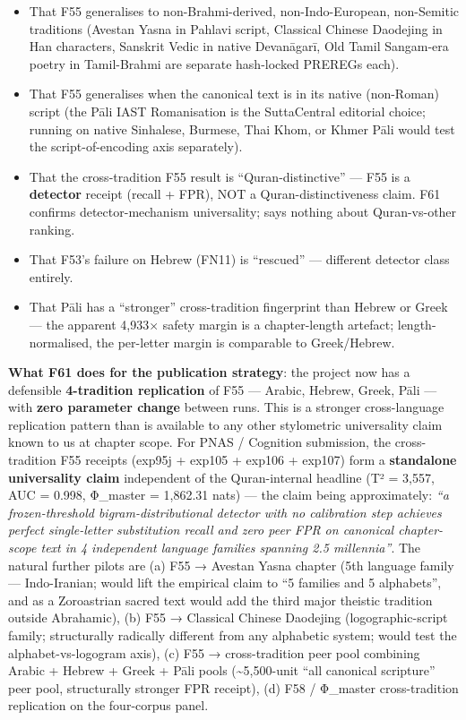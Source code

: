 \documentclass[
]{article}
\providecommand{\tightlist}{%
  \setlength{\itemsep}{0pt}\setlength{\parskip}{0pt}}
\begin{document}
\begin{itemize}
\tightlist
\item
  That F55 generalises to non-Brahmi-derived, non-Indo-European,
  non-Semitic traditions (Avestan Yasna in Pahlavi script, Classical
  Chinese Daodejing in Han characters, Sanskrit Vedic in native
  Devanāgarī, Old Tamil Sangam-era poetry in Tamil-Brahmi are separate
  hash-locked PREREGs each).
\item
  That F55 generalises when the canonical text is in its native
  (non-Roman) script (the Pāli IAST Romanisation is the SuttaCentral
  editorial choice; running on native Sinhalese, Burmese, Thai Khom, or
  Khmer Pāli would test the script-of-encoding axis separately).
\item
  That the cross-tradition F55 result is ``Quran-distinctive'' --- F55
  is a \textbf{detector} receipt (recall + FPR), NOT a
  Quran-distinctiveness claim. F61 confirms detector-mechanism
  universality; says nothing about Quran-vs-other ranking.
\item
  That F53's failure on Hebrew (FN11) is ``rescued'' --- different
  detector class entirely.
\item
  That Pāli has a ``stronger'' cross-tradition fingerprint than Hebrew
  or Greek --- the apparent 4,933× safety margin is a chapter-length
  artefact; length-normalised, the per-letter margin is comparable to
  Greek/Hebrew.
\end{itemize}

\textbf{What F61 does for the publication strategy}: the project now has
a defensible \textbf{4-tradition replication} of F55 --- Arabic, Hebrew,
Greek, Pāli --- with \textbf{zero parameter change} between runs. This
is a stronger cross-language replication pattern than is available to
any other stylometric universality claim known to us at chapter scope.
For PNAS / Cognition submission, the cross-tradition F55 receipts
(exp95j + exp105 + exp106 + exp107) form a \textbf{standalone
universality claim} independent of the Quran-internal headline (T² =
3,557, AUC = 0.998, Φ\_master = 1,862.31 nats) --- the claim being
approximately: \emph{``a frozen-threshold bigram-distributional detector
with no calibration step achieves perfect single-letter substitution
recall and zero peer FPR on canonical chapter-scope text in 4
independent language families spanning 2.5 millennia''}. The natural
further pilots are (a) F55 → Avestan Yasna chapter (5th language family
--- Indo-Iranian; would lift the empirical claim to ``5 families and 5
alphabets'', and as a Zoroastrian sacred text would add the third major
theistic tradition outside Abrahamic), (b) F55 → Classical Chinese
Daodejing (logographic-script family; structurally radically different
from any alphabetic system; would test the alphabet-vs-logogram axis),
(c) F55 → cross-tradition peer pool combining Arabic + Hebrew + Greek +
Pāli pools (\textasciitilde5,500-unit ``all canonical scripture'' peer
pool, structurally stronger FPR receipt), (d) F58 / Φ\_master
cross-tradition replication on the four-corpus panel.
\end{document}
